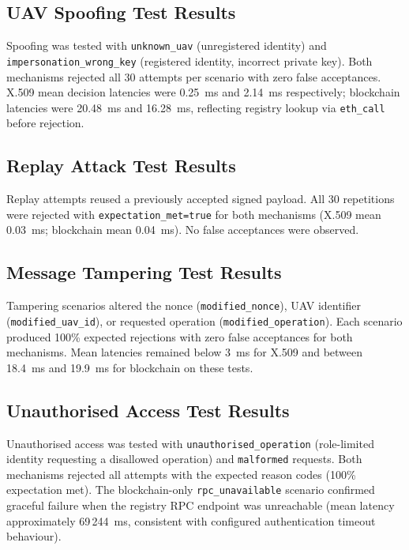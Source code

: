 \subsection{UAV Spoofing Test Results}
\label{sec:ch5-spoofing}

Spoofing was tested with \texttt{unknown\_uav} (unregistered identity) and \texttt{impersonation\_wrong\_key} (registered identity, incorrect private key). Both mechanisms rejected all 30 attempts per scenario with zero false acceptances. X.509 mean decision latencies were 0.25~ms and 2.14~ms respectively; blockchain latencies were 20.48~ms and 16.28~ms, reflecting registry lookup via \texttt{eth\_call} before rejection.

\subsection{Replay Attack Test Results}
\label{sec:ch5-replay}

Replay attempts reused a previously accepted signed payload. All 30 repetitions were rejected with \texttt{expectation\_met=true} for both mechanisms (X.509 mean 0.03~ms; blockchain mean 0.04~ms). No false acceptances were observed.

\subsection{Message Tampering Test Results}
\label{sec:ch5-tampering}

Tampering scenarios altered the nonce (\texttt{modified\_nonce}), UAV identifier (\texttt{modified\_uav\_id}), or requested operation (\texttt{modified\_operation}). Each scenario produced 100\% expected rejections with zero false acceptances for both mechanisms. Mean latencies remained below 3~ms for X.509 and between 18.4~ms and 19.9~ms for blockchain on these tests.

\subsection{Unauthorised Access Test Results}
\label{sec:ch5-unauthorised}

Unauthorised access was tested with \texttt{unauthorised\_operation} (role-limited identity requesting a disallowed operation) and \texttt{malformed} requests. Both mechanisms rejected all attempts with the expected reason codes (100\% expectation met). The blockchain-only \texttt{rpc\_unavailable} scenario confirmed graceful failure when the registry RPC endpoint was unreachable (mean latency approximately 69\,244~ms, consistent with configured authentication timeout behaviour).

